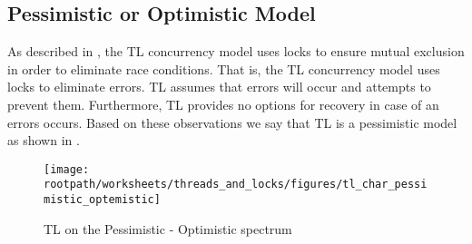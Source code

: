 \subsection{Pessimistic or Optimistic Model}
As described in , the \ac{TL} concurrency model uses locks to ensure mutual exclusion in order to eliminate race conditions. That is, the \ac{TL} concurrency model uses locks to eliminate errors. \ac{TL} assumes that errors will occur and attempts to prevent them. Furthermore, \ac{TL} provides no options for recovery in case of an errors occurs. Based on these observations we say that \ac{TL} is a pessimistic model as shown in .

\begin{figure}[htbp]
\centering
 \texttt{[image: \\rootpath/worksheets/threads\_and\_locks/figures/tl\_char\_pessimistic\_optemistic]} 
 \caption{\ac{TL} on the Pessimistic - Optimistic spectrum}
\label{fig:char_pes_opti}
\end{figure}

\worksheetend
